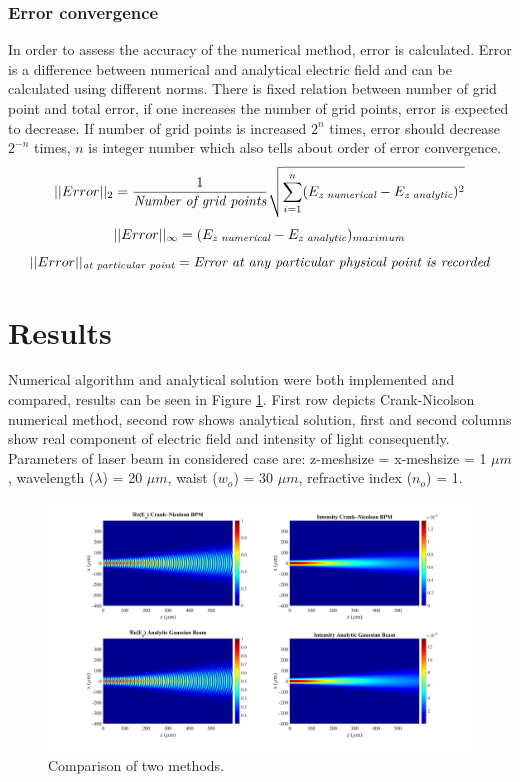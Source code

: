 \documentclass[a4paper]{article}
\begin{document}
	\subsubsection{Error convergence}	
	In order to assess the accuracy of the numerical method, error is calculated. Error is a difference between numerical and analytical electric field and can be calculated using different norms. There is fixed relation between number of grid point and total error, if one increases the number of grid points, error is expected to decrease. If number of grid points is increased $2^n$ times, error should decrease $2^{-n}$ times, $n$ is integer number which also tells about order of error convergence.
	\[||Error||_2 = \frac{1}{\text{{\it Number of grid points}}}\sqrt{\sum\limits_{i=1}^n (E_{\text{\it z numerical}}-E_{\text{\it z analytic}})^2 }
	\]
	\[
	||Error||_\infty = (E_{\text{\it z numerical}}-E_{\text{\it z analytic}})_{maximum}
	\]
	\[ ||Error||_{\text{\it at particular point}} = \text{\it Error at any particular physical point is recorded}
	\]
	\newpage
	\section{Results}
	Numerical algorithm and analytical solution were both implemented and compared, results can be seen in Figure \ref{fig:Results}. First row depicts Crank-Nicolson numerical method, second row shows analytical solution, first and second columns show real component of electric field and intensity of light consequently. Parameters of laser beam in considered case are: z-meshsize = x-meshsize  = 1 $\mu m$, wavelength ($\lambda$) = 20 $\mu m$, waist ($w_o$) = 30 $\mu m$, refractive index ($n_o$) = 1.	
	\begin{figure}[h!]
		\hspace{-30mm}
		\includegraphics[width=1.5\textwidth]{N1.jpg}
		\caption{\label{fig:Results}Comparison of two methods.}
	\end{figure}
\end{document}
